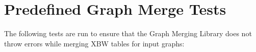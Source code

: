 \documentclass[a4paper,12pt,twoside,BCOR=10mm]{scrbook}
\begin{document}
\section{Predefined Graph Merge Tests}
\label{sec:appendix_graph_merge_tests}
%


The following tests are run to ensure that the Graph Merging Library does not throw errors 
while merging XBW tables for input graphs:
\end{document}
